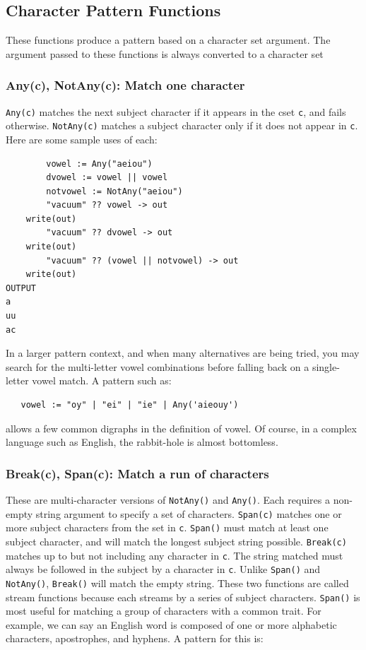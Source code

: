 \documentclass[letterpaper,12pt]{article}
\begin{document}
\subsection{Character Pattern Functions}

These functions produce a pattern based on a character set
argument. The argument passed to these functions is always converted
to a character set

\subsubsection{Any(c), NotAny(c): Match one character}

{\tt Any(c)} matches the next subject character if it appears in the cset
{\tt c}, and fails otherwise. {\tt NotAny(c)} matches a subject
character only if it does not appear in {\tt c}. Here are some sample
uses of each:

\begin{verbatim}
        vowel := Any("aeiou")
        dvowel := vowel || vowel
        notvowel := NotAny("aeiou")
        "vacuum" ?? vowel -> out
	write(out)
        "vacuum" ?? dvowel -> out
	write(out)
        "vacuum" ?? (vowel || notvowel) -> out
	write(out)
OUTPUT
a
uu
ac
\end{verbatim}

In a larger pattern context, and when many alternatives are being
tried, you may search for the multi-letter vowel combinations before
falling back on a single-letter vowel match. A pattern such as:

\begin{verbatim}
   vowel := "oy" | "ei" | "ie" | Any('aieouy')
\end{verbatim}

\noindent
allows a few common digraphs in the definition of vowel.  Of course, in
a complex language such as English, the rabbit-hole is almost bottomless.


\subsubsection{Break(c), Span(c): Match a run of characters}

These are multi-character versions of {\tt NotAny()} and {\tt Any()}.
Each requires a non-empty string argument to specify a set of characters.
{\tt Span(c)} matches one or more subject characters from the set in {\tt c}.
{\tt Span()} must
match at least one subject character, and will match the longest
subject string possible.  {\tt Break(c)} matches up to but not including
any character in {\tt c}. The string matched must always be followed in the
subject by a character in {\tt c}. Unlike {\tt Span()} and {\tt NotAny()},
{\tt Break()}
will match the empty string.  These two functions are called stream
functions because each streams by a series of subject
characters. {\tt Span()} is most useful for matching a group of characters
with a common trait. For example, we can say an English word is
composed of one or more alphabetic characters, apostrophes, and
hyphens. A pattern for this is:
\end{document}
